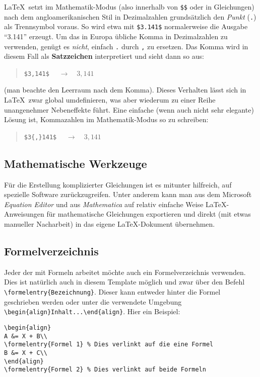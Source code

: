 \LaTeX{}\ setzt im Mathematik-Modus (also innerhalb von \verb!$$! oder in Gleichungen) nach dem angloamerikanischen Stil in Dezimalzahlen grundsätzlich den \emph{Punkt} (\verb!.!) als Trennsymbol voraus. So wird etwa mit \verb!$3.141$! normalerweise die Ausgabe "`3.141"' erzeugt. Um das in Europa übliche Komma in Dezimalzahlen zu verwenden, genügt es \emph{nicht}, einfach \verb!.! durch \verb!,! zu ersetzen. Das Komma wird in diesem Fall
als \textbf{Satzzeichen} interpretiert und sieht dann so aus:
\begin{quote}
\verb!$3,141$!	$\quad \rightarrow \quad 3,141$ 
\end{quote}
(man beachte den Leerraum nach dem Komma). Dieses Verhalten lässt sich in \LaTeX{}\ zwar global umdefinieren, was aber wiederum zu einer Reihe unangenehmer Nebeneffekte führt. Eine einfache (wenn auch nicht sehr elegante) Lösung ist, Kommazahlen im Mathematik-Modus so zu schreiben:
\begin{quote}
\verb!$3{,}141$!	$\quad \rightarrow \quad 3{,}141$
\end{quote}



\subsection{Mathematische Werkzeuge}

Für die Erstellung komplizierter Gleichungen ist es mitunter
hilfreich, auf spezielle Software zurückzugreifen. Unter anderem kann man
aus dem Microsoft \emph{Equation Editor} und aus {\em
Mathematica} auf relativ einfache Weise \LaTeX{}-Anweisungen
für mathematische Gleichungen exportieren und direkt (mit etwas
manueller Nacharbeit) in das eigene \LaTeX{}-Dokument übernehmen.


\subsection{Formelverzeichnis}

Jeder der mit Formeln arbeitet möchte auch ein Formelverzeichnis verwenden. Dies ist natürlich auch in diesem Template möglich und zwar über den Befehl \verb|\formelentry{Bezeichnung}|. Dieser kann entweder hinter die Formel geschrieben werden oder unter die verwendete Umgebung \verb|\begin{align}Inhalt...\end{align}|. Hier ein Beispiel:

\begin{lstlisting}[style=Latex]
\begin{align}
A &= X + B\\
\formelentry{Formel 1} % Dies verlinkt auf die eine Formel
B &= X + C\\
\end{align}
\formelentry{Formel 2} % Dies verlinkt auf beide Formeln 
\end{lstlisting}

